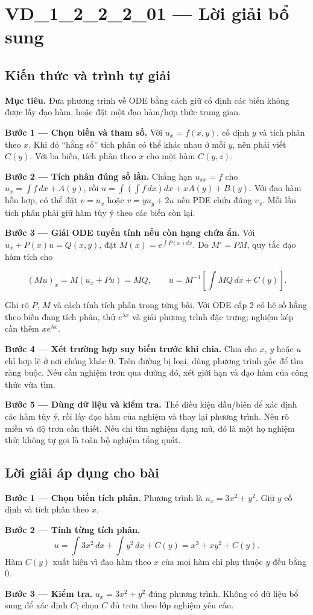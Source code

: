 \documentclass[10pt,a4paper]{article}
\begin{document}
\section*{VD\_1\_2\_2\_2\_01 — Lời giải bổ sung}
\subsection*{Kiến thức và trình tự giải}
\textbf{Mục tiêu.} Đưa phương trình về ODE bằng cách giữ cố định các biến không được lấy đạo hàm, hoặc đặt một đạo hàm/hợp thức trung gian.

\textbf{Bước 1 — Chọn biến và tham số.} Với $u_x=f(x,y)$, cố định $y$ và tích phân theo $x$. Khi đó “hằng số” tích phân có thể khác nhau ở mỗi $y$, nên phải viết $C(y)$. Với ba biến, tích phân theo $x$ cho một hàm $C(y,z)$.

\textbf{Bước 2 — Tích phân đúng số lần.} Chẳng hạn $u_{xx}=f$ cho $u_x=\int f\,dx+A(y)$, rồi $u=\int(\int f\,dx)dx+xA(y)+B(y)$. Với đạo hàm hỗn hợp, có thể đặt $v=u_x$ hoặc $v=yu_y+2u$ nếu PDE chứa đúng $v_x$. Mỗi lần tích phân phải giữ hàm tùy ý theo các biến còn lại.

\textbf{Bước 3 — Giải ODE tuyến tính nếu còn hạng chứa ẩn.} Với $u_x+P(x)u=Q(x,y)$, đặt $M(x)=e^{\int P(x)dx}$. Do $M'=PM$, quy tắc đạo hàm tích cho

\[
(Mu)_x=M(u_x+Pu)=MQ,\qquad
u=M^{-1}\left[\int MQ\,dx+C(y)\right].
\]

Ghi rõ $P$, $M$ và cách tính tích phân trong từng bài. Với ODE cấp 2 có hệ số hằng theo biến đang tích phân, thử $e^{\lambda x}$ và giải phương trình đặc trưng; nghiệm kép cần thêm $xe^{\lambda x}$.

\textbf{Bước 4 — Xét trường hợp suy biến trước khi chia.} Chia cho $x$, $y$ hoặc $u$ chỉ hợp lệ ở nơi chúng khác 0. Trên đường bị loại, dùng phương trình gốc để tìm ràng buộc. Nếu cần nghiệm trơn qua đường đó, xét giới hạn và đạo hàm của công thức vừa tìm.

\textbf{Bước 5 — Dùng dữ liệu và kiểm tra.} Thế điều kiện đầu/biên để xác định các hàm tùy ý, rồi lấy đạo hàm của nghiệm và thay lại phương trình. Nêu rõ miền và độ trơn cần thiết. Nếu chỉ tìm nghiệm dạng mũ, đó là một họ nghiệm thử; không tự gọi là toàn bộ nghiệm tổng quát.
\subsection*{Lời giải áp dụng cho bài}
\textbf{Bước 1 — Chọn biến tích phân.} Phương trình là $u_x=3x^2+y^2$. Giữ $y$ cố định và tích phân theo $x$.

\textbf{Bước 2 — Tính từng tích phân.}
\[u=\int3x^2\,dx+\int y^2\,dx+C(y)=x^3+xy^2+C(y).\]
Hàm $C(y)$ xuất hiện vì đạo hàm theo $x$ của mọi hàm chỉ phụ thuộc $y$ đều bằng 0.

\textbf{Bước 3 — Kiểm tra.} $u_x=3x^2+y^2$ đúng phương trình. Không có dữ liệu bổ sung để xác định $C$; chọn $C$ đủ trơn theo lớp nghiệm yêu cầu.
\end{document}
